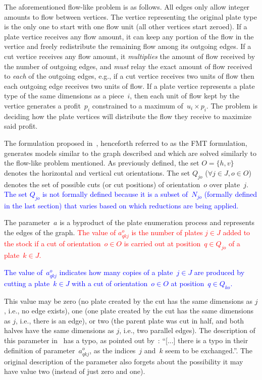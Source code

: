 \documentclass[ppgc,tese,english,formais,babel]{iiufrgs}
\newif\iffinalversion
\newcommand{\newtext}[1]{\iffinalversion%
#1%
\else%
\textcolor{blue}{#1}%
\fi%
}
\newcommand{\oldtext}[1]{\iffinalversion%
\else%
\textcolor{red}{#1}%
\fi%
}
\begin{document}
The aforementioned flow-like problem is as follows.
All edges only allow integer amounts to flow between vertices.
The vertice representing the original plate type is the only one to start with one flow unit (all other vertices start zeroed).
If a plate vertice receives any flow amount, it can keep any portion of the flow in the vertice and freely redistribute the remaining flow among its outgoing edges.
If a cut vertice receives any flow amount, it \emph{multiplies} the amount of flow received by the number of outgoing edges, and \emph{must} relay the exact amount of flow received to \emph{each} of the outgoing edges, e.g., if a cut vertice receives two units of flow then each outgoing edge receives two units of flow.
If a plate vertice represents a plate type of the same dimensions as a piece~\(i\), then each unit of flow kept by the vertice generates a profit~\(p_i\) constrained to a maximum of~\(u_i \times p_i\).
The problem is deciding how the plate vertices will distribute the flow they receive to maximize said profit.

The formulation proposed in~\citet{furini:2016}, henceforth referred to as the FMT formulation, generates models similar to the graph described and which are solved similarly to the flow-like problem mentioned.
As previously defined, the set \(O = \{h, v\}\) denotes the horizontal and vertical cut orientations.
The set \(Q_{jo}\) (\(\forall j \in J, o \in O\)) denotes the set of possible cuts (or cut positions) of orientation~\(o\) over plate~\(j\).
\newtext{The set \(Q_{jo}\) is not formally defined because it is a subset of~\(N_{jo}\) (formally defined in the last section) that varies based on which reductions are being applied.}

The parameter~\(a\) is a byproduct of the plate enumeration process and represents the edges of the graph.
\oldtext{The value of \(a^o_{qkj}\) is the number of plates \(j \in J\) added to the stock if a cut of orientation~\(o \in O\) is carried out at position~\(q \in Q_{jo}\) of a plate~\(k \in J\).}
\newtext{The value of~\(a^o_{qkj}\) indicates how many copies of a plate~\(j \in J\) are produced by cutting a plate~\(k \in J\) with a cut of orientation~\(o \in O\) at position~\(q \in Q_{ko}\).}
This value may be zero (no plate created by the cut has the same dimensions as \(j\), i.e., no edge exists), one (one plate created by the cut has the same dimensions as \(j\), i.e., there is an edge), or two (the parent plate was cut in half, and both halves have the same dimensions as \(j\), i.e., two parallel edges).
The description of this parameter in~\citet{furini:2016} has a typo, as pointed out by~\citet{martin:2020}:
``[...] there is a typo in their definition of parameter~\(a^o_{qkj}\), as the indices~\(j\) and~\(k\) seem to be exchanged.''.
The original description of the parameter also forgets about the possibility it may have value two (instead of just zero and one).
\end{document}

